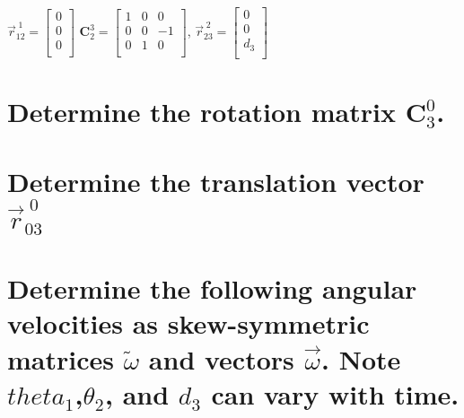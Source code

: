\documentclass[12pt,letterpaper, onecolumn]{exam}
\begin{document}
\begin{questions}
{        \qquad \qquad \qquad \qquad \quad
        $\vec{r}^{\;1}_{12} =
            \begin{bmatrix}
                0 \\
                0 \\
                0 \\
            \end{bmatrix}$
        $\mathbf{C}_2^3 =
            \begin{bmatrix}
                1 & 0 & 0  \\
                0 & 0 & -1 \\
                0 & 1 & 0  \\
            \end{bmatrix}
        $,\quad
        $\vec{r}^{\;2}_{23} =
            \begin{bmatrix}
                0   \\
                0   \\
                d_3 \\
            \end{bmatrix}
        $
    }
    \begin{parts}
        \part{Determine the rotation matrix $\mathbf{C}_3^0$.}

        \part{Determine the translation vector $\vec{r}^{\;0}_{03}$}

        \part{Determine the following angular velocities as skew-symmetric matrices $\tilde{\omega}$ and vectors $\vec{\omega}$. Note $theta_1$,$\theta_2$, and $d_3$ can vary with time.}
        \begin{subparts}



        \end{subparts}


\end{parts}
\end{questions}
\end{document}
